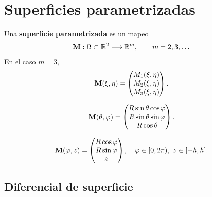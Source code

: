 \section{Superficies parametrizadas}
\label{sec:superficies}

\begin{definicion}
  \label{def:superficie}
  Una \textbf{superficie parametrizada} es un mapeo
  \begin{equation}
    \label{eq:superficie}
    \mathbf{M}:\Omega\subset\mathbb{R}^2\longrightarrow\mathbb{R}^m,
    \qquad m=2,3,\dots
  \end{equation}
  En el caso $m=3$,
  \begin{equation}
    \label{eq:superficie_3d}
    \mathbf{M}(\xi,\eta)=
    \begin{pmatrix}
      M_1(\xi,\eta)\\
      M_2(\xi,\eta)\\
      M_3(\xi,\eta)
    \end{pmatrix}.
  \end{equation}
\end{definicion}

\begin{ejemplo}[Esfera]
  \label{ej:esfera_superficie}
  \begin{equation}
    \label{eq:esfera_superficie}
    \mathbf{M}(\theta,\varphi)=
    \begin{pmatrix}
      R\sin\theta\cos\varphi\\
      R\sin\theta\sin\varphi\\
      R\cos\theta
    \end{pmatrix}.
  \end{equation}
\end{ejemplo}

\begin{ejemplo}[Cilindro]
  \label{ej:cilindro}
  \begin{equation}
    \label{eq:cilindro}
    \mathbf{M}(\varphi,z)=
    \begin{pmatrix}
      R\cos\varphi\\
      R\sin\varphi\\
      z
    \end{pmatrix},
    \quad \varphi\in[0,2\pi),\ z\in[-h,h].
  \end{equation}
\end{ejemplo}

\subsection{Diferencial de superficie}
\label{subsec:diferencial_superficie}


